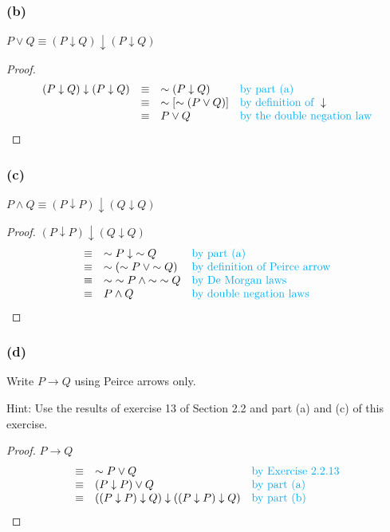 \documentclass[14pt]{extarticle}
\newcommand{\da}{\downarrow}
\begin{document}
\subsubsection{(b)}
$P \vee Q \equiv (P \da Q) \da (P \da Q)$

\begin{proof}
$$
\begin{array}{rcll}
(P \da Q) \da (P \da Q) & \equiv & {\sim (P \da Q)} & \text{\color{cyan}by part (a)} \\
& \equiv & {\sim[{\sim (P \vee Q)}]} & \text{\color{cyan}by definition of } \da \\
& \equiv & P \vee Q & \text{\color{cyan}by the double negation law} \\
\end{array}
$$
\end{proof}

\subsubsection{(c)}
$P \wedge Q \equiv (P \da P) \da (Q \da Q)$

\begin{proof}
$(P \da P) \da (Q \da Q)$
$$
\begin{array}{cll}
\equiv & {\sim P} \da {\sim Q} & \text{\color{cyan}by part (a)} \\
\equiv & {\sim ({\sim P} \vee {\sim Q})} & \text{\color{cyan}by definition of Peirce arrow} \\
\equiv & {\sim {\sim P}} \wedge {\sim {\sim Q}} & \text{\color{cyan}by De Morgan laws} \\
\equiv & P \wedge Q & \text{\color{cyan}by double negation laws} \\
\end{array}
$$
\end{proof}

\subsubsection{(d)}
Write $P \to Q$ using Peirce arrows only.

Hint: Use the results of exercise 13 of Section 2.2 and part (a) and (c) of this exercise.

\begin{proof}
$P \to Q$
$$
\begin{array}{cll}
\equiv & {\sim P} \vee Q & \text{\color{cyan}by Exercise 2.2.13} \\
\equiv & (P \da P) \vee Q & \text{\color{cyan}by part (a)} \\ \equiv & ((P \da P) \da Q) \da ((P \da P) \da Q) & \text{\color{cyan}by part (b)} \\
\end{array}
$$
\end{proof}
\end{document}
